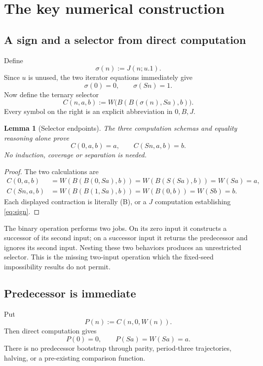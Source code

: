 \documentclass[11pt]{article}
\newtheorem{lemma}[theorem]{Lemma}
\theoremstyle{definition}
\begin{document}
\section{The key numerical construction}
\label{sec:bootstrap}

\subsection{A sign and a selector from direct computation}

Define
\[
 \sigma(n):=J(n;u.1).
\]
Since $u$ is unused, the two iterator equations immediately give
\[
 \sigma(0)=0,\qquad \sigma(Sn)=1.
 \tag{Sign endpoints}\label{eq:sign}
\]
Now define the ternary selector
\begin{equation}
 C(n,a,b):=W\bigl(B(B(\sigma(n),Sa),b)\bigr).
 \label{def:C}
\end{equation}
Every symbol on the right is an explicit abbreviation in $0,B,J$.

\begin{lemma}[Selector endpoints]
\label{lem:C}
The three computation schemas and equality reasoning alone prove
\[
 C(0,a,b)=a,\qquad C(Sn,a,b)=b.
\]
No induction, coverage or separation is needed.
\end{lemma}
\begin{proof}
The two calculations are
\begin{align*}
 C(0,a,b)
 &=W(B(B(0,Sa),b))
  =W(B(S(Sa),b))=W(Sa)=a,\\
 C(Sn,a,b)
 &=W(B(B(1,Sa),b))
  =W(B(0,b))=W(Sb)=b.
\end{align*}
Each displayed contraction is literally (B), or a $J$ computation
establishing \eqref{eq:sign}.
\end{proof}

The binary operation performs two jobs. On its zero input it constructs
a successor of its second input; on a successor input it returns the
predecessor and ignores its second input. Nesting these two behaviors
produces an unrestricted selector. This is the missing two-input
operation which the fixed-seed impossibility results do not permit.

\subsection{Predecessor is immediate}

Put
\begin{equation}
 P(n):=C(n,0,W(n)).\label{def:P}
\end{equation}
Then direct computation gives
\[
 P(0)=0,\qquad P(Sa)=W(Sa)=a.
 \tag{Predecessor}\label{eq:P}
\]
There is no predecessor bootstrap through parity, period-three
trajectories, halving, or a pre-existing comparison function.
\end{document}
